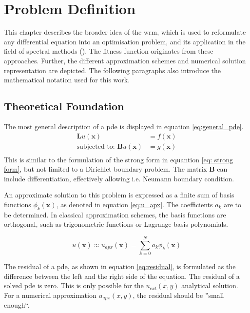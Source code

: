 \documentclass[./\jobname.tex]{subfiles}
\begin{document}
\chapter{Problem Definition}
This chapter describes the broader idea of the \gls{wrm}, which is used to reformulate any differential equation into an optimisation problem, and its application in the field of spectral methods (\cite{shen_spectral_2011}). The fitness function originates from these approaches. Further, the different approximation schemes and numerical solution representation are depicted. The following paragraphs also introduce the mathematical notation used for this work. 

\section{Theoretical Foundation}
\label{chap:opt_problem}

The most general description of a \gls{pde} is displayed in equation \ref{eq:general_pde}.
\begin{equation}
\label{eq:general_pde}
\begin{split}
\mathbf{L}u(\mathbf{x}) & = f(\mathbf{x}) \\
\text{subjected to: }\mathbf{B}u(\mathbf{x}) & = g(\mathbf{x}) \\
\end{split}
\end{equation}
This is similar to the formulation of the strong form in equantion \ref{eq: strong form}, but not limited to a Dirichlet boundary problem. The matrix $\mathbf{B}$ can include differentiation, effectively allowing i.e. Neumann boundary condition. 

An approximate solution to this problem is expressed as a finite sum of basis functions $\phi_k(\mathbf{x})$, as denoted in equation \ref{eq:u_apx}. The coefficients $a_k$ are to be determined. In classical approximation schemes, the basis functions are orthogonal, such as trigonometric functions or Lagrange basis polynomials. 

\begin{equation}
\label{eq:u_apx}
u(\mathbf{x}) \approx u_{apx}(\mathbf{x}) = \sum_{k=0}^{N} a_k \phi_k (\mathbf{x})
\end{equation}

The residual of a \gls{pde}, as shown in equation \ref{eq:residual}, is formulated as the difference between the left and the right side of the equation. The residual of a solved \gls{pde} is zero. This is only possible for the $u_{ext}(x,y)$ analytical solution. For a numerical approximation $u_{apx}(x,y)$, the residual should be ''small enough``. 
\end{document}
